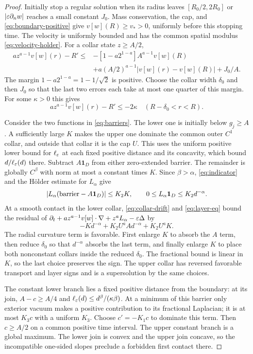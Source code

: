 \begin{proof}
Initially stop a regular solution when its radius leaves $[R_0/2,2R_0]$
or $|\varepsilon\partial_nw|$ reaches a small constant $J_0$.
Mass conservation, the cap, and \eqref{eq:boundary-positive} give
$v[w](R)\geq v_*>0$, uniformly before this stopping time.
The velocity is uniformly bounded and has the common spatial modulus
\eqref{eq:velocity-holder}. For a collar state $z\geq A/2$,
\begin{align*}
 az^{a-1}v[w](r)-R'
 \leq{}&-[1-a2^{1-a}]A^{a-1}v[w](R)\\
 &+a(A/2)^{a-1}|v[w](r)-v[w](R)|+J_0/A.
\end{align*}
The margin $1-a2^{1-a}=1-1/\sqrt2$ is positive. Choose the collar width
$\delta_0$ and then $J_0$ so that the last two errors each take at most
one quarter of this margin. For some $\kappa>0$ this gives
\begin{equation}\label{eq:collar-drift}
 az^{a-1}v[w](r)-R'\leq-2\kappa
 \quad (R-\delta_0<r<R).
\end{equation}

Consider the two functions in \eqref{eq:barriers}. The lower one is initially
below $g_j\geq A$. A sufficiently large $K$ makes the upper one dominate
the common outer $C^1$ collar, and outside that collar it is the cap $U$.
This uses the uniform positive lower bound for $\ell_\varepsilon$ at each fixed
positive distance and its concavity, which bound $d/\ell_\varepsilon(d)$ there.
Subtract $A\mathbf1_D$ from either zero-extended barrier. The remainder
is globally $C^\beta$ with norm at most a constant times $K$.
Since $\beta>\alpha$, \eqref{eq:indicator} and the H\"older estimate for
$L_\alpha$ give
\[
 |L_\alpha(\hbox{barrier}-A\mathbf1_D)|\leq K_2K,
 \qquad 0\leq L_\alpha\mathbf1_D\leq K_2d^{-\alpha}.
\]
At a smooth contact in the lower collar, \eqref{eq:collar-drift} and
\eqref{eq:layer-eq} bound the residual of
$\partial_t+a z^{a-1}v[w]\cdot\nabla+z^aL_\alpha-\varepsilon\Delta$
by
\[
 -K d^{-\alpha}+K_2U^aA d^{-\alpha}+K_2U^aK.
\]
The radial curvature term is favorable. First enlarge $K$ to absorb the
$A$ term, then reduce $\delta_0$ so that $d^{-\alpha}$ absorbs the last
term, and finally enlarge $K$ to place both nonconstant collars inside the
reduced $\delta_0$. The fractional bound is linear in $K$, so the last
choice preserves the sign. The upper collar has reversed favorable
transport and layer signs and is a supersolution by the same choices.

The constant lower branch lies a fixed positive distance from the boundary:
at its join, $A-c\geq A/4$ and
$\ell_\varepsilon(d)\leq d^\beta/(\kappa\beta)$. At a minimum of this barrier
only exterior vacuum makes a positive contribution to its fractional
Laplacian; it is at most $K_3c$ with a uniform $K_3$.
Choose $c'=-K_1c$ to dominate this term. Then $c\geq A/2$ on a common
positive time interval. The upper constant branch is a global maximum.
The lower join is convex and the upper join concave, so the incompatible
one-sided slopes preclude a forbidden first contact there.


\end{proof}

